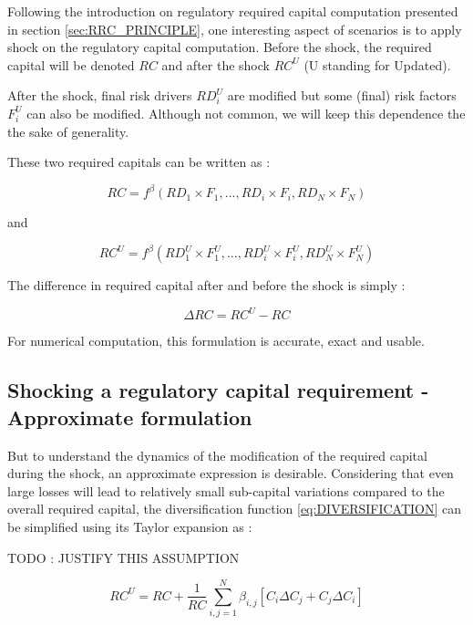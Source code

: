 Following the introduction on regulatory required capital computation presented in section \ref{sec:RRC_PRINCIPLE}, one interesting aspect of scenarios is to apply shock on the regulatory capital computation. Before the shock, the required capital will be denoted $RC$ and after the shock $RC^U$ (U standing for Updated).

After the shock, final risk drivers $RD_i^U$ are modified but some (final) risk factors $F_i^U$ can also be modified. Although not common, we will keep this dependence the the sake of generality.

These two required capitals can be written as :

\begin{equation}
	RC = f^{\beta}(RD_1 \times F_1,... , RD_i \times F_i, RD_N \times F_N)
\end{equation}

and

\begin{equation}
	RC^U = f^{\beta}(RD_1^U \times F_1^U,... , RD_i^U \times F_i^U, RD_N^U \times F_N^U)
\end{equation}

The difference in required capital after and before the shock is simply :

\begin{equation}
	\Delta RC = RC^U - RC
\end{equation}

For numerical computation, this formulation is accurate, exact and usable. 


\subsection{Shocking a regulatory capital requirement - Approximate formulation}


But to understand the dynamics of the modification of the required capital during the shock, an approximate expression is desirable. Considering that even large losses will lead to relatively small sub-capital variations compared to the overall required capital, the diversification function \ref{eq:DIVERSIFICATION} can be simplified using its Taylor expansion as :

TODO : JUSTIFY THIS ASSUMPTION

\begin{equation}
	RC^U = RC + \frac{1}{RC} \sum_{i,j=1}^{N} \beta_{i,j} \left[ C_i \Delta C_j+ C_j \Delta C_i \right]
\end{equation}

